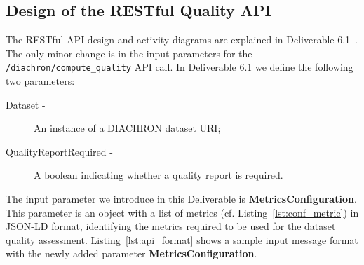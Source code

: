
\subsection{Design of the RESTful Quality API}
\label{sec:RestAPI} 
The RESTful API design and activity diagrams are explained in Deliverable 6.1~\cite[Section 6.1.7]{diachron-d6.1}.
The only minor change is in the input parameters for the \texttt{\url{/diachron/compute_quality}} API call.
In Deliverable 6.1 we define the following two parameters:
\begin{description}
\item[Dataset -] An instance of a DIACHRON dataset URI;
\item[QualityReportRequired -] A boolean indicating whether a quality report is required.
\end{description}
The input parameter we introduce in this Deliverable is \textbf{MetricsConfiguration}.
This parameter is an object with a list of metrics (cf. Listing~\ref{lst:conf_metric}) in JSON-LD format, identifying the metrics required to be used for the dataset quality assessment.
Listing~\ref{lst:api_format} shows a sample input message format with the newly added parameter \textbf{MetricsConfiguration}.
 

